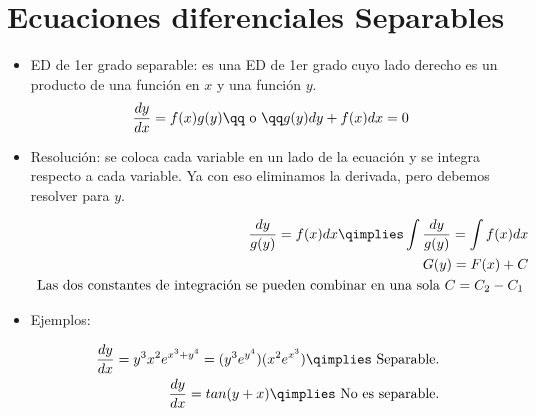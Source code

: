 \section{Ecuaciones diferenciales Separables}
\begin{itemize}
    \item ED de 1er grado separable: es una ED de 1er grado cuyo lado derecho es un producto de una función en $x$ y una función $y$.
        \[
          \frac{d y}{d x} = f(x)g(y) \qq \text{ o } \qq g(y)dy+f(x)dx=0
        \]
    
    \item Resolución: se coloca cada variable en un lado de la ecuación y se integra respecto a cada variable. Ya con eso eliminamos la derivada, pero debemos resolver para $y$.
        \begin{center}
           \begin{align*}
               \frac{d y}{g(y)} = f(x)dx \qimplies \int \frac{d y}{g(y)} = \int f(x)dx \\ 
               G(y) = F(x) + C \\ 
               \text{ Las dos constantes de integración se pueden combinar en una sola $C = C_2-C_1$  } \\ 
           \end{align*}
        \end{center}
    
    \item Ejemplos: 
        \begin{center}
           \begin{align*}
               \frac{d y}{d x} = y^3x^2e^{x^3+y^4} = (y^3e^{y^4})(x^2e^{x^3}) \qimplies \text{ Separable. } \\ 
               \frac{d y}{d x} = tan(y+x) \qimplies \text{ No es separable. } \\ 
           \end{align*}
        \end{center}
\end{itemize}

